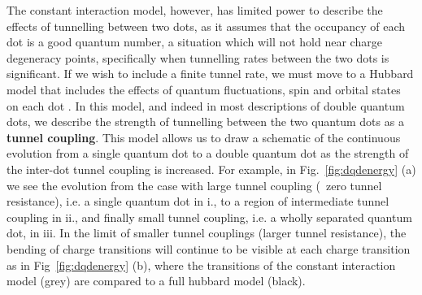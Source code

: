 The constant interaction model, however, has limited power to describe the effects of tunnelling between two dots,
as it assumes that the occupancy of each dot is a good quantum number, a situation which will not hold near
charge degeneracy points, specifically when tunnelling rates between the two dots is significant. If we wish to include a finite tunnel
rate, we must move to a Hubbard model that includes the effects of quantum fluctuations, spin and orbital states on each
dot \cite{PhysRevB.84.115301}. In this model, and indeed in most descriptions of double quantum dots, we
describe the strength of tunnelling between the two quantum dots as a \textbf{tunnel coupling}. This model allows us to draw a schematic
of the continuous evolution from a single quantum dot to a double quantum dot as the strength of the inter-dot tunnel coupling
is increased. For example, in Fig.~\ref{fig:dqdenergy} (a) we see the evolution from the case with large tunnel coupling (~zero tunnel resistance), i.e. a single
quantum dot in i., to a region of intermediate tunnel coupling in ii., and finally small tunnel coupling, i.e. a wholly separated quantum dot, in iii. In the
limit of smaller tunnel couplings (larger tunnel resistance), the bending of charge transitions will continue to be visible
at each charge transition as in Fig~\ref{fig:dqdenergy} (b), where the transitions of the constant interaction model (grey) are compared to
a full hubbard model (black).


